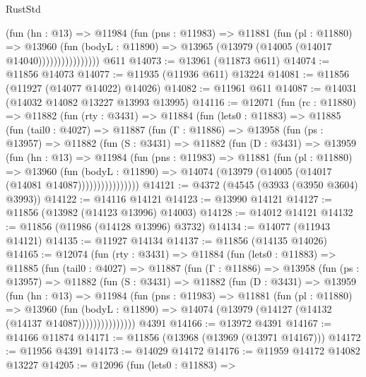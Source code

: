 \begin{lexlean}{RustStd}
\begin{coremodule}
                      (fun (hn : @13) =>
                      @11984
                        (fun (pns : @11983) =>
                        @11881
                          (fun (pl : @11880) =>
                          @13960
                            (fun (bodyL : @11890) =>
                            @13965 (@13979 (@14005 (@14017 @14040))))))))))))))))
    @611
@14073 := @13961 (@11873 @611)
@14074 := @11856 @14073
@14077 := @11935 (@11936 @611) @13224
@14081 := @11856 (@11927 (@14077 @14022) @14026)
@14082 := @11961 @611
@14087 := @14031 (@14032 @14082 @13227 @13993 @13995)
@14116 := @12071
    (fun (rc : @11880) =>
    @11882
      (fun (rty : @3431) =>
      @11884
        (fun (lets0 : @11883) =>
        @11885
          (fun (tail0 : @4027) =>
          @11887
            (fun (Γ : @11886) =>
            @13958
              (fun (ps : @13957) =>
              @11882
                (fun (S : @3431) =>
                @11882
                  (fun (D : @3431) =>
                  @13959
                    (fun (hn : @13) =>
                    @11984
                      (fun (pns : @11983) =>
                      @11881
                        (fun (pl : @11880) =>
                        @13960
                          (fun (bodyL : @11890) =>
                          @14074 (@13979 (@14005 (@14017 (@14081 @14087))))))))))))))))
@14121 := @4372 (@4545 (@3933 (@3950 @3604) @3993))
@14122 := @14116 @14121
@14123 := @13990 @14121
@14127 := @11856 (@13982 (@14123 @13996) @14003)
@14128 := @14012 @14121
@14132 := @11856 (@11986 (@14128 @13996) @3732)
@14134 := @14077 (@11943 @14121)
@14135 := @11927 @14134
@14137 := @11856 (@14135 @14026)
@14165 := @12074
    (fun (rty : @3431) =>
    @11884
      (fun (lets0 : @11883) =>
      @11885
        (fun (tail0 : @4027) =>
        @11887
          (fun (Γ : @11886) =>
          @13958
            (fun (ps : @13957) =>
            @11882
              (fun (S : @3431) =>
              @11882
                (fun (D : @3431) =>
                @13959
                  (fun (hn : @13) =>
                  @11984
                    (fun (pns : @11983) =>
                    @11881
                      (fun (pl : @11880) =>
                      @13960
                        (fun (bodyL : @11890) =>
                        @14074 (@13979 (@14127 (@14132 (@14137 @14087)))))))))))))))
    @4391
@14166 := @13972 @4391
@14167 := @14166 @11874
@14171 := @11856 (@13968 (@13969 (@13971 @14167)))
@14172 := @11956 @4391
@14173 := @14029 @14172
@14176 := @11959 @14172 @14082 @13227
@14205 := @12096
    (fun (lets0 : @11883) =>

\end{coremodule}
\end{lexlean}
